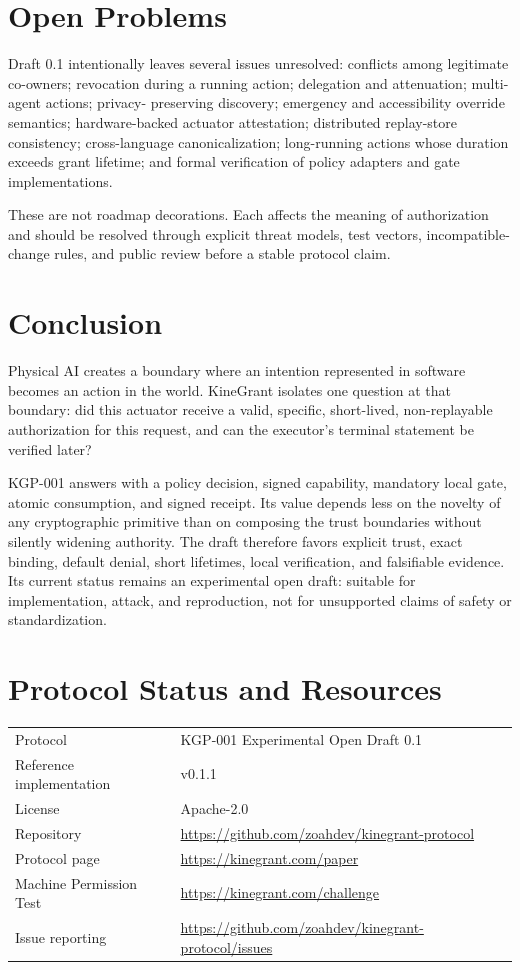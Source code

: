 \documentclass[10.5pt,a4paper]{article}
\begin{document}
\section{Open Problems}

Draft 0.1 intentionally leaves several issues unresolved: conflicts among legitimate co-owners;
revocation during a running action; delegation and attenuation; multi-agent actions; privacy-
preserving discovery; emergency and accessibility override semantics; hardware-backed actuator
attestation; distributed replay-store consistency; cross-language canonicalization; long-running
actions whose duration exceeds grant lifetime; and formal verification of policy adapters and
gate implementations.

These are not roadmap decorations. Each affects the meaning of authorization and should be
resolved through explicit threat models, test vectors, incompatible-change rules, and public
review before a stable protocol claim.

\section{Conclusion}

Physical AI creates a boundary where an intention represented in software becomes an action in
the world. KineGrant isolates one question at that boundary: did this actuator receive a valid,
specific, short-lived, non-replayable authorization for this request, and can the executor's
terminal statement be verified later?

KGP-001 answers with a policy decision, signed capability, mandatory local gate, atomic
consumption, and signed receipt. Its value depends less on the novelty of any cryptographic
primitive than on composing the trust boundaries without silently widening authority. The draft
therefore favors explicit trust, exact binding, default denial, short lifetimes, local verification,
and falsifiable evidence. Its current status remains an experimental open draft: suitable for
implementation, attack, and reproduction, not for unsupported claims of safety or standardization.

\section*{Protocol Status and Resources}

\begin{tabularx}{\linewidth}{@{}p{43mm}Y@{}}
\toprule
Protocol & KGP-001 Experimental Open Draft 0.1 \\
Reference implementation & v0.1.1 \\
License & Apache-2.0 \\
Repository & \url{https://github.com/zoahdev/kinegrant-protocol} \\
Protocol page & \url{https://kinegrant.com/paper} \\
Machine Permission Test & \url{https://kinegrant.com/challenge} \\
Issue reporting & \url{https://github.com/zoahdev/kinegrant-protocol/issues} \\
\bottomrule
\end{tabularx}
\end{document}

